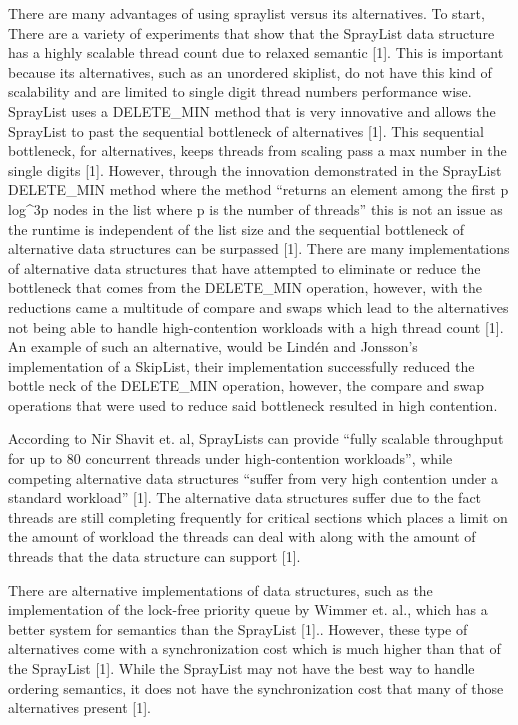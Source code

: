 \documentclass[conference]{IEEEtran}
\begin{document}
There are many advantages of using spraylist versus its alternatives. To start, There are a variety of experiments that show that the SprayList data structure has a highly scalable thread count due to relaxed semantic [1]. This is important because its alternatives, such as an unordered skiplist, do not have this kind of scalability and are limited to single digit thread numbers performance wise. SprayList uses a DELETE_MIN method that is very innovative and allows the SprayList to past the  sequential bottleneck of alternatives [1]. This sequential bottleneck, for alternatives, keeps threads from scaling pass a max number in the single digits [1]. However, through the innovation demonstrated in the SprayList  DELETE_MIN method where the method “returns an element among the first p log^{3}p nodes in the list where p is the number of threads” this is not an issue as the runtime is independent of the list size and  the sequential bottleneck of alternative data structures can be surpassed [1].  There are many implementations of alternative data structures that have attempted to eliminate or reduce the bottleneck that comes from the DELETE_MIN operation, however, with the reductions came a multitude of compare and swaps which lead to the alternatives not being able to handle high-contention workloads with a high thread count [1]. An example of such an alternative, would be Lindén and Jonsson’s implementation of a SkipList, their implementation successfully reduced the bottle neck of the DELETE_MIN operation, however, the compare and swap operations that were used to reduce said bottleneck resulted in high contention. 


According to Nir Shavit et. al, SprayLists can provide “fully scalable throughput  for up to 80 concurrent threads under high-contention workloads”, while competing alternative data structures “suffer from very high contention under a standard workload” [1]. The alternative data structures suffer due to the fact threads are still completing frequently for critical sections which places a limit on the amount of workload the threads can deal with along with the amount of threads that the data structure can support [1]. 


There are alternative implementations of data structures, such as the implementation of the lock-free priority queue by Wimmer et. al., which has a better system for semantics than the SprayList [1].. However, these type of alternatives come with a synchronization cost which is much higher than that of the SprayList [1]. While the SprayList may not have the best way to handle ordering semantics, it does not have the synchronization cost that many of those alternatives present [1].
\end{document}
